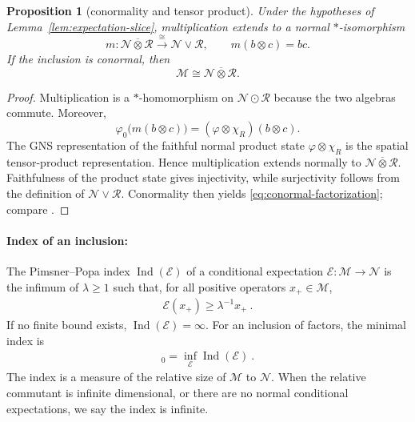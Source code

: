 \documentclass[a4paper,11pt]{article}
\newtheorem{proposition}[theorem]{Proposition}
\theoremstyle{definition}
\newcommand{\mE}{\mathcal{E}}
\begin{document}
\begin{proposition}[conormality and tensor product]\label{prop:conormal-factorization}
Under the hypotheses of Lemma~\ref{lem:expectation-slice}, multiplication
extends to a normal $*$-isomorphism
\begin{equation}
 m:\mathcal N\overline\otimes\mathcal R
 \overset{\cong}{\longrightarrow}\mathcal N\vee\mathcal R,
 \qquad m(b\otimes c)=b c.
\end{equation}
If the inclusion is conormal, then
\begin{equation}\label{eq:conormal-factorization}
\mathcal M\cong
 \mathcal N\overline\otimes\mathcal R .
\end{equation}
\end{proposition}

\begin{proof}
Multiplication is a $*$-homomorphism on $\mathcal N\odot\mathcal R$ because
the two algebras commute.  Moreover,
\begin{equation}
 \varphi_0\bigl(m(b\otimes c)\bigr)
 =(\varphi\otimes\chi_R)(b\otimes c).
\end{equation}
The GNS representation of the faithful normal product state
$\varphi\otimes\chi_R$ is the spatial tensor-product representation.  Hence
multiplication extends normally to $\mathcal N\overline\otimes\mathcal R$.
Faithfulness of the product state gives injectivity, while surjectivity follows
from the definition of $\mathcal N\vee\mathcal R$.  Conormality then yields
\eqref{eq:conormal-factorization}; compare
\cite{Faulkner2020,FaulknerSperanza2024}.
\end{proof}

\paragraph{Index of an inclusion:} The Pimsner--Popa index $\operatorname{Ind}(\mE)$ of a conditional expectation $\mE:\mathcal M\to \mathcal N$ is the infimum of $\lambda\geq1$ such that, for all positive operators $x_+\in\mathcal M$,
\begin{align}
    \mE(x_+)\geq \lambda^{-1}x_+\ .
\end{align}
If no finite bound exists, $\operatorname{Ind}(\mE)=\infty$. For an inclusion of factors, the minimal index is
\begin{align}
    [\mathcal M:\mathcal N]_0=\inf_\mE \operatorname{Ind}(\mE)\ .
\end{align}
The index is a measure of the relative size of $\mathcal M$ to $\mathcal N$. When the relative commutant is infinite dimensional, or there are no normal conditional expectations, we say the index is infinite.
\end{document}
